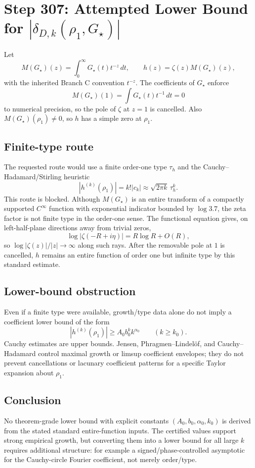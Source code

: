 \documentclass[11pt]{article}
\begin{document}
\section*{Step 307: Attempted Lower Bound for \texorpdfstring{$|\delta_{D,k}(\rho_1,G_\star)|$}{delta}}

Let
\[
  M(G_\star)(z)=\int_0^\infty G_\star(t)t^{-z}\,dt,\qquad
  h(z)=\zeta(z)M(G_\star)(z),
\]
with the inherited Branch C convention \(t^{-z}\).  The coefficients of
\(G_\star\) enforce
\[
  M(G_\star)(1)=\int G_\star(t)t^{-1}\,dt=0
\]
to numerical precision, so the pole of \(\zeta\) at \(z=1\) is cancelled.
Also \(M(G_\star)(\rho_1)\neq 0\), so \(h\) has a simple zero at \(\rho_1\).

\subsection*{Finite-type route}

The requested route would use a finite order-one type \(\tau_h\) and the
Cauchy--Hadamard/Stirling heuristic
\[
  |h^{(k)}(\rho_1)|=k!|c_k|\approx \sqrt{2\pi k}\,\tau_h^k.
\]
This route is blocked.  Although \(M(G_\star)\) is an entire transform of a
compactly supported \(C^\infty\) function with exponential indicator bounded
by \(\log 3.7\), the zeta factor is not finite type in the order-one sense.
The functional equation gives, on left-half-plane directions away from trivial
zeros,
\[
  \log|\zeta(-R+i\eta)| = R\log R + O(R),
\]
so \(\log|\zeta(z)|/|z|\to\infty\) along such rays.  After the removable pole
at \(1\) is cancelled, \(h\) remains an entire function of order one but
infinite type by this standard estimate.

\subsection*{Lower-bound obstruction}

Even if a finite type were available, growth/type data alone do not imply a
coefficient lower bound of the form
\[
  |h^{(k)}(\rho_1)|\ge A_0 b_0^k k^{\alpha_0}\qquad(k\ge k_0).
\]
Cauchy estimates are upper bounds.  Jensen, Phragmen--Lindelöf, and
Cauchy--Hadamard control maximal growth or limsup coefficient envelopes; they
do not prevent cancellations or lacunary coefficient patterns for a specific
Taylor expansion about \(\rho_1\).

\subsection*{Conclusion}

No theorem-grade lower bound with explicit constants
\((A_0,b_0,\alpha_0,k_0)\) is derived from the stated standard entire-function
inputs.  The certified values support strong empirical growth, but converting
them into a lower bound for all large \(k\) requires additional structure:
for example a signed/phase-controlled asymptotic for the Cauchy-circle Fourier
coefficient, not merely order/type.
\end{document}
